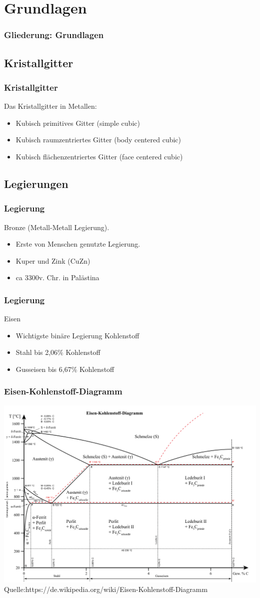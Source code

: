 \section{Grundlagen}

\begin{frame}[t]\frametitle{Gliederung: Grundlagen}
\tableofcontents[
currentsection,
subsectionstyle=show/show/hide
]
\end{frame}

\subsection{Kristallgitter}
\label{grnd:gitter}
\begin{frame}[c]\frametitle{Kristallgitter}
	Das Kristallgitter in Metallen:
	\begin{itemize}
		\item{Kubisch primitives Gitter (simple cubic)}
		\item{Kubisch raumzentriertes Gitter (body centered cubic)}
		\item{Kubisch flächenzentriertes Gitter (face centered cubic)}
	\end{itemize}
\end{frame}

\subsection{Legierungen}
\label{grnd:legierungen}
\begin{frame}[c]\frametitle{Legierung}
	Bronze (Metall-Metall Legierung).
	\begin{itemize}
		\item{Erste von Menschen genutzte Legierung.}
		\item{Kuper und Zink (CuZn)}
		\item{ca 3300v. Chr. in Palästina}
	\end{itemize}
\end{frame}

\begin{frame}[c]\frametitle{Legierung}
	Eisen
	\begin{itemize}
		\item{Wichtigste binäre Legierung Kohlenstoff}
		\item{Stahl bis 2,06\% Kohlenstoff}
		\item{Gusseisen bis 6,67\% Kohlenstoff}
	\end{itemize}
\end{frame}

\begin{frame}[c]\frametitle{Eisen-Kohlenstoff-Diagramm}
	\centering
	\includegraphics[height=0.5\textwidth]{medien/ekd.png}
	\\
	\tiny{Quelle:https://de.wikipedia.org/wiki/Eisen-Kohlenstoff-Diagramm}
\end{frame}
